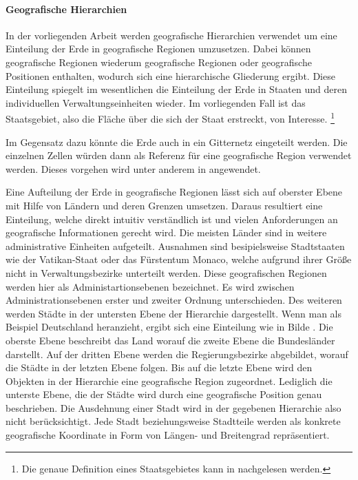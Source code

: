 		\paragraph*{Geografische Hierarchien}
		In der vorliegenden Arbeit werden geografische Hierarchien verwendet um eine Einteilung der Erde in geografische Regionen umzusetzen.
		Dabei können geografische Regionen wiederum geografische Regionen oder geografische Positionen enthalten, wodurch sich eine hierarchische Gliederung ergibt.
		Diese Einteilung spiegelt im wesentlichen die Einteilung der Erde in Staaten und deren individuellen Verwaltungseinheiten wieder.
		Im vorliegenden Fall ist das Staatsgebiet, also die Fläche über die sich der Staat erstreckt, von Interesse. \footnote{Die genaue Definition eines Staatsgebietes kann in \cite{jellinek1921} nachgelesen werden.} 

		Im Gegensatz dazu könnte die Erde auch in ein Gitternetz eingeteilt werden. 
		Die einzelnen Zellen würden dann als Referenz für eine geografische Region verwendet werden.
		Dieses vorgehen wird unter anderem in \cite{Serdyukov2009} angewendet.

		Eine Aufteilung der Erde in geografische Regionen lässt sich auf oberster Ebene mit Hilfe von Ländern und deren Grenzen umsetzen. 
		Daraus resultiert eine Einteilung, welche direkt intuitiv verständlich ist und vielen Anforderungen an geografische Informationen gerecht wird.
		Die meisten Länder sind in weitere administrative Einheiten aufgeteilt.
		Ausnahmen sind besipielsweise Stadtstaaten wie der Vatikan-Staat oder das Fürstentum Monaco, welche aufgrund ihrer Größe nicht in Verwaltungsbezirke unterteilt werden.
		Diese geografischen Regionen werden hier als Administartionsebenen bezeichnet.
		Es wird zwischen Administrationsebenen erster und zweiter Ordnung unterschieden. 
		Des weiteren werden Städte in der untersten Ebene der Hierarchie dargestellt.
		Wenn man als Beispiel Deutschland heranzieht, ergibt sich eine Einteilung wie in Bilde .
		Die oberste Ebene beschreibt das Land worauf die zweite Ebene die Bundesländer darstellt.
		Auf der dritten Ebene werden die Regierungsbezirke abgebildet, worauf die Städte in der letzten Ebene folgen. 
		Bis auf die letzte Ebene wird den Objekten in der Hierarchie eine geografische Region zugeordnet. 
		Lediglich die unterste Ebene, die der Städte wird durch eine geografische Position genau beschrieben. 
		Die Ausdehnung einer Stadt wird in der gegebenen Hierarchie also nicht berücksichtigt. 
		Jede Stadt beziehungsweise Stadtteile werden als konkrete geografische Koordinate in Form von Längen- und Breitengrad repräsentiert. 

